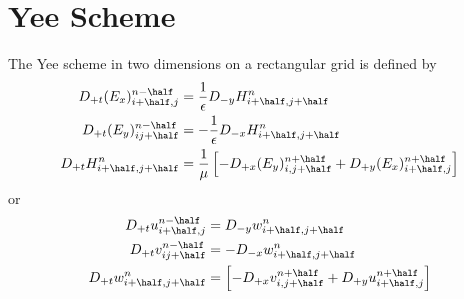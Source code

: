 \documentclass[10pt]{article}
\begin{document}
% 
% 
% 
% 


\newcommand{\ph}{+\half}
\newcommand{\mh}{-\half}

\section{Yee Scheme}

The Yee scheme in two dimensions on a rectangular grid is defined by
\begin{align}
  D_{+t} (E_x)_{i\ph,j}^{n\mh} &=  {1\over\eps} D_{-y} H_{i\ph,j\ph}^n  \label{eq:yeeEx} \\
  D_{+t} (E_y)_{ij\ph}^{n\mh}  &= -{1\over\eps} D_{-x} H_{i\ph,j\ph}^n  \label{eq:yeeEy}\\
 D_{+t} H_{i\ph,j\ph}^{n} &=  {1\over\mu}\left[ - D_{+x} (E_y)_{i,j\ph}^{n\ph}
               + D_{+y} (E_x)_{i\ph,j}^{n\ph} \right]\\
\end{align}
or
\begin{align*}
  D_{+t} u_{i\ph,j}^{n\mh} &=  D_{-y} w_{i\ph,j\ph}^n  \\
  D_{+t} v_{ij\ph}^{n\mh}  &= -D_{-x} w_{i\ph,j\ph}^n  \\
 D_{+t} w_{i\ph,j\ph}^{n} &=  \left[ - D_{+x} v_{i,j\ph}^{n\ph}
               + D_{+y} u_{i\ph,j}^{n\ph} \right]\\
\end{align*}
\end{document}
